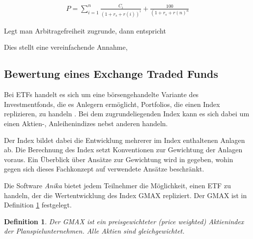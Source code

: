 \documentclass[12pt, a4paper]{article}
\theoremstyle{plain}
\newtheorem{definition}{Definition}
\begin{document}

\begin{align*}
	P=\sum_{i=1}^{n} \frac{C_{i}}{\left(1+r_{s}+r(i)\right)^{i}}+\frac{100}{\left(1+r_{s}+r(n)^{n}\right.}
\end{align*}

Legt man Arbitragefreiheit zugrunde, dann entspricht 


Dies stellt eine vereinfachende Annahme, 




\subsection{Bewertung eines Exchange Traded Funds}
\label{sec:bewertung_eines_exchange_traded_funds}

Bei \glspl{ETF} handelt es sich um eine börsengehandelte Variante des Investmentfonds, die es Anlegern ermöglicht, Portfolios, die einen Index replizieren, zu handeln \autocite[][S.~103]{bodie_investments_2018}. Bei dem zugrundeliegenden Index kann es sich dabei um einen Aktien-, Anleihenindizes nebst anderen handeln.

Der Index bildet dabei die Entwicklung mehrerer im Index enthaltenen Anlagen ab.
Die Berechnung des Index setzt Konventionen zur Gewichtung der Anlagen voraus. Ein Überblick über Ansätze zur Gewichtung wird in \textcite[][S.~44~ff.]{bodie_investments_2018} gegeben, wohin gegen sich dieses Fachkonzept auf verwendete Ansätze beschränkt.

Die Software \textit{Anika} bietet jedem Teilnehmer die Möglichkeit, einen ETF zu handeln, der die Wertentwicklung des Index \gls{GMAX} repliziert. Der \gls{GMAX} ist in Definition \ref{def:gmax} festgelegt.

\begin{definition}
	\label{def:gmax}
	Der \gls{GMAX} ist ein preisgewichteter (\textit{price weighted}) Aktienindex der Planspielunternehmen. Alle Aktien sind gleichgewichtet.
\end{definition}
\end{document}
